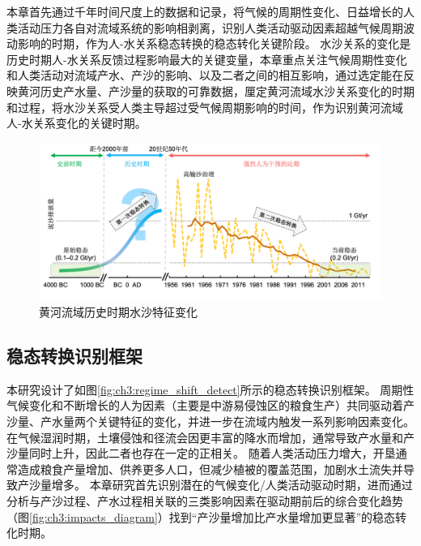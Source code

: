 
本章首先通过千年时间尺度上的数据和记录，将气候的周期性变化、日益增长的人类活动压力各自对流域系统的影响相剥离，识别人类活动驱动因素超越气候周期波动影响的时期，作为人-水关系稳态转换的稳态转化关键阶段。
水沙关系的变化是历史时期人-水关系反馈过程影响最大的关键变量，本章重点关注气候周期性变化和人类活动对流域产水、产沙的影响、以及二者之间的相互影响，通过选定能在反映黄河历史产水量、产沙量的获取的可靠数据，厘定黄河流域水沙关系变化的时期和过程，将水沙关系受人类主导超过受气候周期影响的时间，作为识别黄河流域人-水关系变化的关键时期。

\begin{figure}[!h] %
    \centering
    \includegraphics[width=\textwidth]{img/ch3/ch3_why_regime_shift.png}
    \caption{黄河流域历史时期水沙特征变化}\label{fig:ch3:why_regime_shift}
\end{figure}

\subsection{稳态转换识别框架}\label{sec:ch3:approach}

本研究设计了如图\ref{fig:ch3:regime_shift_detect}所示的稳态转换识别框架。
周期性气候变化和不断增长的人为因素（主要是中游易侵蚀区的粮食生产）共同驱动着产沙量、产水量两个关键特征的变化，并进一步在流域内触发一系列影响因素变化\cite{xujiongxin2011}。
在气候湿润时期，土壤侵蚀和径流会因更丰富的降水而增加，通常导致产水量和产沙量同时上升，因此二者也存在一定的正相关\cite{GeQuanSheng2011}。
随着人类活动压力增大，开垦通常造成粮食产量增加、供养更多人口，但减少植被的覆盖范围，加剧水土流失并导致产沙量增多\cite{wu2020a}。
本章研究首先识别潜在的气候变化/人类活动驱动时期，进而通过分析与产沙过程、产水过程相关联的三类影响因素在驱动期前后的综合变化趋势（图\ref{fig:ch3:impacts_diagram}）找到“产沙量增加比产水量增加更显著”的稳态转化时期。

